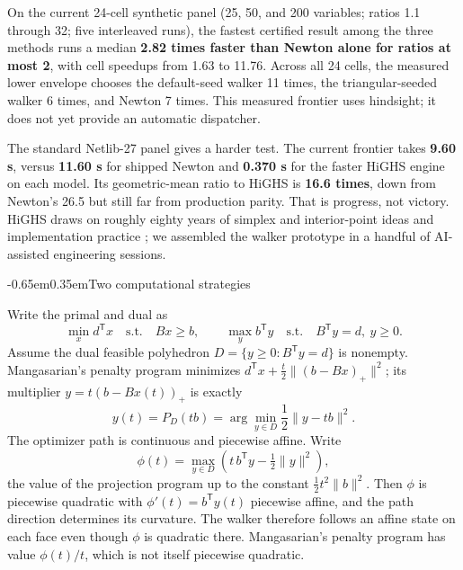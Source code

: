\documentclass[10pt,letterpaper]{article}
\makeatletter
\renewcommand\section{\@startsection{section}{1}{0pt}%
  {-0.65em}{0.35em}{\normalfont\Large\bfseries}}
\makeatother
\begin{document}
On the current 24-cell synthetic panel (25, 50, and 200 variables; ratios 1.1 through 32; five interleaved runs), the fastest certified result among the three methods runs a median \textbf{2.82 times faster than Newton alone for ratios at most 2}, with cell speedups from 1.63 to 11.76. Across all 24 cells, the measured lower envelope chooses the default-seed walker 11 times, the triangular-seeded walker 6 times, and Newton 7 times. This measured frontier uses hindsight; it does not yet provide an automatic dispatcher.

The standard Netlib-27 panel gives a harder test. The current frontier takes \textbf{9.60 s}, versus \textbf{11.60 s} for shipped Newton and \textbf{0.370 s} for the faster HiGHS engine on each model. Its geometric-mean ratio to HiGHS is \textbf{16.6 times}, down from Newton's 26.5 but still far from production parity. That is progress, not victory. HiGHS draws on roughly eighty years of simplex and interior-point ideas and implementation practice \citep{huangfu-hall-2018}; we assembled the walker prototype in a handful of AI-assisted engineering sessions.

\section{Two computational strategies}

Write the primal and dual as
\[
  \min_x d^\mathsf{T}x \quad\text{s.t.}\quad Bx\ge b,
  \qquad
  \max_y b^\mathsf{T}y \quad\text{s.t.}\quad B^\mathsf{T}y=d,\ y\ge0.
\]
Assume the dual feasible polyhedron $D=\{y\ge0:B^\mathsf{T}y=d\}$ is nonempty. Mangasarian's penalty program minimizes $d^\mathsf{T}x+\frac{t}{2}\lVert(b-Bx)_+\rVert^2$; its multiplier $y=t(b-Bx(t))_+$ is exactly
\[
  y(t)=P_D(tb)=\arg\min_{y\in D}\frac12\lVert y-tb\rVert^2.
\]
The optimizer path is continuous and piecewise affine. Write
\[
  \phi(t)=\max_{y\in D}\left(t\,b^\mathsf{T}y-\tfrac12\lVert y\rVert^2\right),
\]
the value of the projection program up to the constant $\tfrac12 t^2\lVert b\rVert^2$. Then $\phi$ is piecewise quadratic with $\phi'(t)=b^\mathsf{T}y(t)$ piecewise affine, and the path direction determines its curvature. The walker therefore follows an affine state on each face even though $\phi$ is quadratic there. Mangasarian's penalty program has value $\phi(t)/t$, which is not itself piecewise quadratic.
\end{document}
